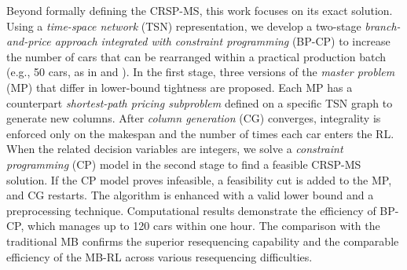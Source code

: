 \documentclass[12pt]{article}
\begin{document}
Beyond formally defining the CRSP-MS, this work focuses on its exact solution. Using a \textit{time-space network} (TSN) representation, we develop a two-stage \textit{branch-and-price approach integrated with constraint programming} (BP-CP) to increase the number of cars that can be rearranged within a practical production batch (e.g., 50 cars, as in \citet{wu2021mathematical} and \citet{guo2025logic}). In the first stage, %
three versions of the \textit{master problem} (MP) that differ in lower-bound tightness are proposed. Each MP has a counterpart \textit{shortest-path pricing subproblem} defined on a specific TSN graph to generate new columns. After \textit{column generation} (CG) converges, integrality is enforced only on the makespan and the number of times each car enters the RL. When the related decision variables are integers, we solve a \textit{constraint programming} (CP) model in the second stage to find a feasible CRSP-MS solution. If the CP model proves infeasible, a feasibility cut is added to the MP, and CG restarts. The algorithm is enhanced with a valid lower bound and a preprocessing technique. Computational results demonstrate the efficiency of BP-CP, which manages up to 120 cars within one hour. The comparison with the traditional MB confirms the superior resequencing capability and the comparable efficiency of the MB-RL across various resequencing difficulties.

\end{document}
